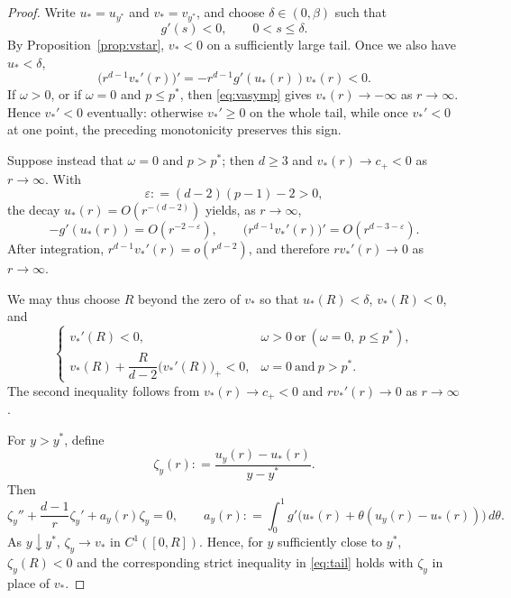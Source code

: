 \documentclass[12pt, a4paper, reqno]{amsart}
\numberwithin{equation}{section}
\theoremstyle{definition}
\theoremstyle{remark}
\newcommand{\eps}{\varepsilon}
\newcommand{\ce}{\mathrel{\mathop:}=}
\begin{document}
\begin{proof}
Write $u_*=u_{y^*}$ and $v_*=v_{y^*}$, and choose $\delta\in(0,\beta)$ such
that
\begin{equation}\label{eq:gneg}
  g'(s)<0,\qquad 0<s\le \delta.
\end{equation}
By Proposition~\ref{prop:vstar}, $v_*<0$ on a sufficiently large tail.
Once we also have $u_*<\delta$,
\[
  \bigl(r^{d-1}v_*'(r)\bigr)'
  =-r^{d-1}g'(u_*(r))v_*(r)<0.
\]
If $\omega>0$, or if $\omega=0$ and $p\le p^*$, then
\eqref{eq:vasymp} gives $v_*(r)\to-\infty$ as $r\to\infty$.
Hence $v_*'<0$ eventually:
otherwise $v_*'\ge0$ on the whole tail, while once $v_*'<0$ at one point,
the preceding monotonicity preserves this sign.

Suppose instead that $\omega=0$ and $p>p^*$; then $d\ge3$ and
$v_*(r)\to c_+<0$ as $r\to\infty$. With
\[
  \eps\ce (d-2)(p-1)-2>0,
\]
the decay $u_*(r)=O(r^{-(d-2)})$ yields, as $r\to\infty$,
\[
  -g'(u_*(r))=O(r^{-2-\eps}),
  \qquad
  \bigl(r^{d-1}v_*'(r)\bigr)'=O(r^{d-3-\eps}).
\]
After integration,
$r^{d-1}v_*'(r)=o(r^{d-2})$, and therefore $rv_*'(r)\to0$ as
$r\to\infty$.

We may thus choose $R$ beyond the zero of $v_*$ so that $u_*(R)<\delta$,
$v_*(R)<0$, and
\begin{equation}\label{eq:tail}
\begin{cases}
  v_*'(R)<0,
    & \omega>0\ \text{or}\ (\omega=0,\ p\le p^*),\\[2pt]
  v_*(R)+\dfrac{R}{d-2}\bigl(v_*'(R)\bigr)_+<0,
    & \omega=0\ \text{and}\ p>p^*.
\end{cases}
\end{equation}
The second inequality follows from $v_*(r)\to c_+<0$ and
$rv_*'(r)\to0$ as $r\to\infty$.

For $y>y^*$, define
\[
  \zeta_y(r)\ce \frac{u_y(r)-u_*(r)}{y-y^*}.
\]
Then
\begin{equation*}
  \zeta_y''+\frac{d-1}{r}\zeta_y'+a_y(r)\zeta_y=0,
  \qquad
  a_y(r)\ce \int_0^1
    g'\bigl(u_*(r)+\theta(u_y(r)-u_*(r))\bigr)\,d\theta.
\end{equation*}
As $y\downarrow y^*$, $\zeta_y\to v_*$ in $C^1([0,R])$. Hence, for $y$
sufficiently close to $y^*$, $\zeta_y(R)<0$ and the corresponding strict
inequality in \eqref{eq:tail} holds with $\zeta_y$ in place of $v_*$.


\end{proof}
\end{document}
